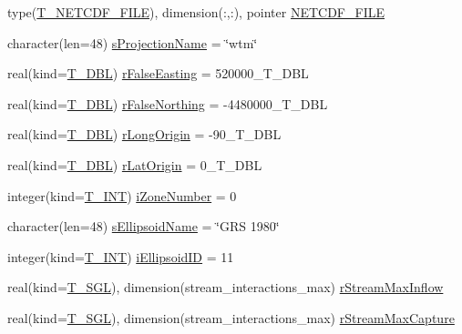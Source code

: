 \begin{DoxyCompactItemize}
\item 
type(\hyperlink{typetypes_1_1_t___n_e_t_c_d_f___f_i_l_e}{T\_\-NETCDF\_\-FILE}), dimension(:,:), pointer \hyperlink{typetypes_1_1_t___m_o_d_e_l___c_o_n_f_i_g_u_r_a_t_i_o_n_add16140ef933dff07917068a856fffde}{NETCDF\_\-FILE}
\item 
character(len=48) \hyperlink{typetypes_1_1_t___m_o_d_e_l___c_o_n_f_i_g_u_r_a_t_i_o_n_a04cf64fadeec85d5a0fcfbb840a9c7f0}{sProjectionName} = \char`\"{}wtm\char`\"{}
\item 
real(kind=\hyperlink{namespacetypes_a888737411068474a167b1c3e5b579c58}{T\_\-DBL}) \hyperlink{typetypes_1_1_t___m_o_d_e_l___c_o_n_f_i_g_u_r_a_t_i_o_n_a01ee35fbc67c848ec9a41dd9df5af302}{rFalseEasting} = 520000\_\-T\_\-DBL
\item 
real(kind=\hyperlink{namespacetypes_a888737411068474a167b1c3e5b579c58}{T\_\-DBL}) \hyperlink{typetypes_1_1_t___m_o_d_e_l___c_o_n_f_i_g_u_r_a_t_i_o_n_a088e9de6ff8d8346074f3781debe6d80}{rFalseNorthing} = -\/4480000\_\-T\_\-DBL
\item 
real(kind=\hyperlink{namespacetypes_a888737411068474a167b1c3e5b579c58}{T\_\-DBL}) \hyperlink{typetypes_1_1_t___m_o_d_e_l___c_o_n_f_i_g_u_r_a_t_i_o_n_a4f981ff8ee88ec05fcdda6fe5bd09599}{rLongOrigin} = -\/90\_\-T\_\-DBL
\item 
real(kind=\hyperlink{namespacetypes_a888737411068474a167b1c3e5b579c58}{T\_\-DBL}) \hyperlink{typetypes_1_1_t___m_o_d_e_l___c_o_n_f_i_g_u_r_a_t_i_o_n_a1aad4b961ea490971d4180252dbeff6d}{rLatOrigin} = 0\_\-T\_\-DBL
\item 
integer(kind=\hyperlink{namespacetypes_a4e4d040a4425196c4d43be63e7e6103a}{T\_\-INT}) \hyperlink{typetypes_1_1_t___m_o_d_e_l___c_o_n_f_i_g_u_r_a_t_i_o_n_a48d2fb845a138044667778ecbe9b8b6d}{iZoneNumber} = 0
\item 
character(len=48) \hyperlink{typetypes_1_1_t___m_o_d_e_l___c_o_n_f_i_g_u_r_a_t_i_o_n_adebcd7cd85e7da34936ebaa90fcb0f2b}{sEllipsoidName} = \char`\"{}GRS 1980\char`\"{}
\item 
integer(kind=\hyperlink{namespacetypes_a4e4d040a4425196c4d43be63e7e6103a}{T\_\-INT}) \hyperlink{typetypes_1_1_t___m_o_d_e_l___c_o_n_f_i_g_u_r_a_t_i_o_n_abfe0a08dd20154be720b8ebac6001881}{iEllipsoidID} = 11
\item 
real(kind=\hyperlink{namespacetypes_af3012489af4c138f271f1bce244b7e51}{T\_\-SGL}), dimension(stream\_\-interactions\_\-max) \hyperlink{typetypes_1_1_t___m_o_d_e_l___c_o_n_f_i_g_u_r_a_t_i_o_n_afa027b1f3076f5273d9ab83b893d03ab}{rStreamMaxInflow}
\item 
real(kind=\hyperlink{namespacetypes_af3012489af4c138f271f1bce244b7e51}{T\_\-SGL}), dimension(stream\_\-interactions\_\-max) \hyperlink{typetypes_1_1_t___m_o_d_e_l___c_o_n_f_i_g_u_r_a_t_i_o_n_a0708256407027113296a232420c6f196}{rStreamMaxCapture}
\end{DoxyCompactItemize}


